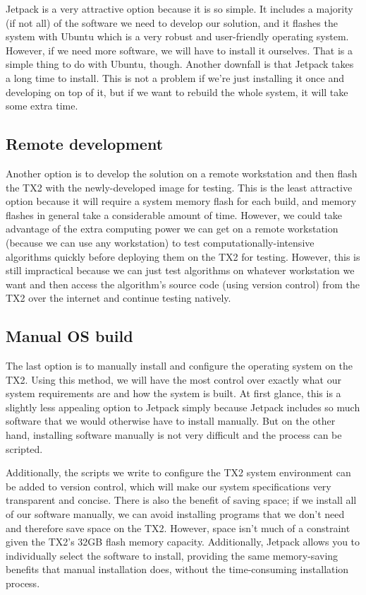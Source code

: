 \documentclass[letterpaper,10pt,serif,draftclsnofoot,onecolumn,compsoc,titlepage]{IEEEtran}
\begin{document}
Jetpack is a very attractive option because it is so simple. It includes a majority (if not all) of the software we need to develop our solution, and it flashes the system with Ubuntu which is a very robust and user-friendly operating system. However, if we need more software, we will have to install it ourselves. That is a simple thing to do with Ubuntu, though. Another downfall is that Jetpack takes a long time to install. This is not a problem if we're just installing it once and developing on top of it, but if we want to rebuild the whole system, it will take some extra time.

\subsection{Remote development}
Another option is to develop the solution on a remote workstation and then flash the TX2 with the newly-developed image for testing. This is the least attractive option because it will require a system memory flash for each build, and memory flashes in general take a considerable amount of time. However, we could take advantage of the extra computing power we can get on a remote workstation (because we can use any workstation) to test computationally-intensive algorithms quickly before deploying them on the TX2 for testing. However, this is still impractical because we can just test algorithms on whatever workstation we want and then access the algorithm's source code (using version control) from the TX2 over the internet and continue testing natively.

\subsection{Manual OS build}
The last option is to manually install and configure the operating system on the TX2. Using this method, we will have the most control over exactly what our system requirements are and how the system is built. At first glance, this is a slightly less appealing option to Jetpack simply because Jetpack includes so much software that we would otherwise have to install manually. But on the other hand, installing software manually is not very difficult and the process can be scripted. 

Additionally, the scripts we write to configure the TX2 system environment can be added to version control, which will make our system specifications very transparent and concise. There is also the benefit of saving space; if we install all of our software manually, we can avoid installing programs that we don't need and therefore save space on the TX2. However, space isn't much of a constraint given the TX2's 32GB flash memory capacity. Additionally, Jetpack allows you to individually select the software to install, providing the same memory-saving benefits that manual installation does, without the time-consuming installation process.
\end{document}
